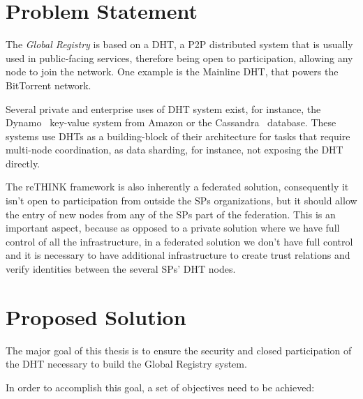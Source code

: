 \section{Problem Statement}
\label{section:problem-statement}

The \textit{Global Registry} is based on a \ac{DHT}, a \ac{P2P} distributed system  that is usually used in public-facing services, therefore being open to participation, allowing any node to join the network.
One example is the Mainline \ac{DHT}, that powers the BitTorrent network.

Several private and enterprise uses of DHT system exist, for instance, the Dynamo~\cite{dynamo2007} key-value system from Amazon or the Cassandra~\cite{cassandra2010} database.
These systems use \acp{DHT} as a building-block of their architecture for tasks that require multi-node coordination, as data sharding, for instance, not exposing the \ac{DHT} directly.

The reTHINK framework is also inherently a federated solution, consequently it isn't open to participation from outside the \acp{SP} organizations, but it should allow the entry of new nodes from any of the \acp{SP} part of the federation.
This is an important aspect, because as opposed to a private solution where we have full control of all the infrastructure, in a federated solution we don't have full control and it is necessary to have additional infrastructure to create trust relations and verify identities between the several \acp{SP}' \ac{DHT} nodes.

\section{Proposed Solution}
\label{section:proposed}

The major goal of this thesis is to ensure the security and closed participation of the \ac{DHT} necessary to build the Global Registry system.

In order to accomplish this goal, a set of objectives need to be achieved:

